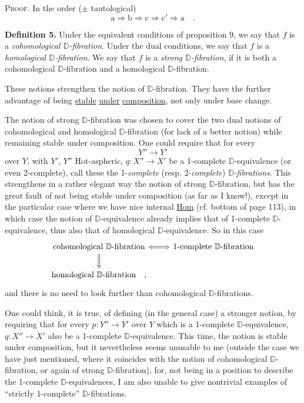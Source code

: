 \documentclass[11pt]{article}
\newcommand{\printedpage}[1]{\marginpar{\footnotesize p.~#1}}
\newcommand{\msp}[1]{\marginpar{\footnotesize [#1]}}
\newcommand{\D}{\mathbb{D}}
\newcommand{\sfup}[1]{\textsf{\upshape #1}}
\newcommand{\Hot}{\sfup{Hot}}
\newcommand{\Hom}{\sfup{Hom}}
\begin{document}
\textsc{Proof}. In the order ($\pm$ tautological)
\[
\mathrm{a} \Longrightarrow \mathrm{b} \Longrightarrow \mathrm{c} \Longrightarrow \mathrm{c}' \Longrightarrow \mathrm{a} \quad .
\]

\textbf{Definition 5.} Under the equivalent conditions of proposition 9, we say that $f$ is a \textit{cohomological $\D$-fibration}. Under the dual conditions, we say that $f$ is a \textit{homological $\D$-fibration}. We say that $f$ is a \textit{strong $\D$-fibration}, if it is both a cohomological $\D$-fibration and a homological $\D$-fibration.

These notions strengthen the notion of $\D$-fibration. They have the further advantage of being \underline{stable} \underline{under} \underline{composition}, not only under base change.

\msp{page 122}The notion of strong $\D$-fibration was chosen to cover the two dual notions of cohomological and homological $\D$-fibration (for lack of a better notion) while remaining stable under composition. One could require that for every %
\[
Y'' \longrightarrow Y'
\]
over $Y$, with $Y'$, $Y''$ \Hot-aspheric, $q : X'' \to X'$ be a 1-complete $\D$-equivalence (or even 2-complete), call these the 1-\textit{complete} (resp. 2-\textit{complete}) $\D$-\textit{fibrations}. This strengthens in a rather elegant way the notion of strong $\D$-fibration, but has the great fault of not being stable under composition (as far as I know!), except in the particular case where we have nice internal \underline{\Hom} (cf. bottom of page 113), in which case the notion of $\D$-equivalence already implies that of 1-complete $\D$-equivalence,
\printedpage{73}
\msp{page 123}thus also that of homological $\D$-equivalence. So in this case
\[
\begin{tikzcd}
\text{cohomological $\D$-fibration} \arrow[r, Leftrightarrow] \arrow[d, Rightarrow] & \text{1-complete $\D$-fibration} \\
\text{homological $\D$-fibration} \quad , &
\end{tikzcd}
\]
and there is no need to look further than cohomological $\D$-fibrations.

One could think, it is true, of defining (in the general case) a stronger notion, by requiring that for every $p : Y'' \to Y'$ over $Y$ which is a 1-complete $\D$-equivalence, $q : X'' \to X'$ also be a 1-complete $\D$-equivalence. This time, the notion is stable under composition, but it nevertheless seems unusable to me (outside the case we have just mentioned, where it coincides with the notion of cohomological $\D$-fibration, or again of strong $\D$-fibration), for, not being in a position to describe the 1-complete $\D$-equivalences, I am also unable to give nontrivial examples of ``strictly 1-complete'' $\D$-fibrations.
\end{document}
